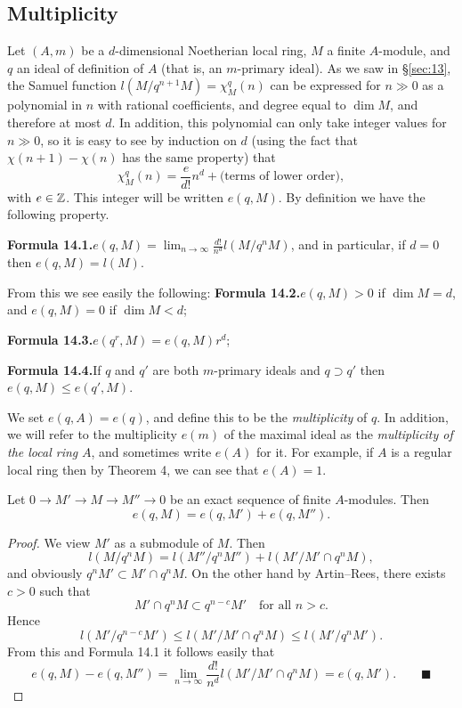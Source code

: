 \subsection*{Multiplicity}

Let $(A, m)$ be a $d$-dimensional Noetherian local ring, $M$ a finite $A$-module,
and $q$ an ideal of definition of $A$ (that is, an $m$-primary ideal). As we saw
in \S\ref{sec:13}, the Samuel function $l(M/q^{n+1}M) = \chi_M^q(n)$ can be expressed for
$n \gg 0$ as a polynomial in $n$ with rational coefficients, and degree equal to
$\dim M$, and therefore at most $d$. In addition, this polynomial can only take
integer values for $n \gg 0$, so it is easy to see by induction on $d$ (using the fact
that $\chi(n + 1) - \chi(n)$ has the same property) that
\[
  \chi_M^q(n) = \frac{e}{d!}n^d + \text{(terms of lower order)},
\]
with $e \in \mathbb{Z}$. This integer will be written $e(q, M)$. By definition we have the
following property.

\smallskip
\noindent\textbf{Formula 14.1.}\quad $\displaystyle e(q, M) = \lim_{n \to \infty} \frac{d!}{n^d}l(M/q^nM)$, and in particular, if $d = 0$ then
$e(q, M) = l(M)$.

\smallskip
\noindent From this we see easily the following:
\noindent\textbf{Formula 14.2.}\quad $e(q, M) > 0$ if $\dim M = d$, and $e(q, M) = 0$ if $\dim M < d$;

\smallskip
\noindent\textbf{Formula 14.3.}\quad $e(q^r, M) = e(q, M)r^d$;

\smallskip
\noindent\textbf{Formula 14.4.}\quad If $q$ and $q'$ are both $m$-primary ideals and $q \supset q'$ then
$e(q, M) \le e(q', M)$.

\smallskip
\noindent We set $e(q, A) = e(q)$, and define this to be the \emph{multiplicity} of $q$. In addition,
we will refer to the multiplicity $e(m)$ of the maximal ideal as the \emph{multiplicity of the
local ring} $A$, and sometimes write $e(A)$ for it. For example, if $A$ is a
regular local ring then by Theorem 4, we can see that $e(A) = 1$.

\begin{theorem}\label{thm:14.6}
Let $0 \to M' \to M \to M'' \to 0$ be an exact sequence of
finite $A$-modules. Then
\[
  e(q, M) = e(q, M') + e(q, M'').
\]
\end{theorem}

\begin{proof}
We view $M'$ as a submodule of $M$. Then
\[
  l(M/q^nM) = l(M''/q^nM'') + l(M'/M' \cap q^nM),
\]
and obviously $q^nM' \subset M' \cap q^nM$. On the other hand by Artin--Rees, there
exists $c > 0$ such that
\[
  M' \cap q^nM \subset q^{n-c}M' \quad \text{for all } n > c.
\]
Hence
\[
  l(M'/q^{n-c}M') \le l(M'/M' \cap q^nM) \le l(M'/q^nM').
\]
From this and Formula 14.1 it follows easily that
\[
  e(q, M) - e(q, M'') = \lim_{n \to \infty} \frac{d!}{n^d}l(M'/M' \cap q^nM) = e(q, M'). \qquad\blacksquare
\]
\end{proof}


